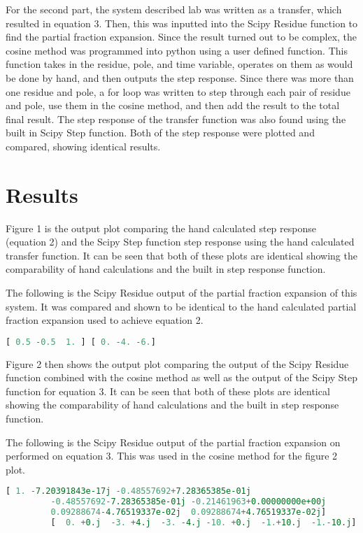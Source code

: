 \documentclass[12pt, titlepage]{article}
\begin{document}
       For the second part, the system described lab was written as a transfer, which resulted in equation 3.  Then, this was inputted into the Scipy Residue function to find the partial fraction expansion.  Since the result turned out to be complex, the cosine method was programmed into python using a user defined function.  This function takes in the residue, pole, and time variable, operates on them as would be done by hand, and then outputs the step response.  Since there was more than one residue and pole, a for loop was written to step through each pair of residue and pole, use them in the cosine method, and then add the result to the total final result.  The step response of the transfer function was also found using the built in Scipy Step function.  Both of the step response were plotted and compared, showing identical results.
        
        \section{Results}
       Figure 1 is the output plot comparing the hand calculated step response (equation 2) and the Scipy Step function step response using the hand calculated transfer function.  It can be seen that both of these plots are identical showing the comparability of hand calculations and the built in step response function.
       
       The following is the Scipy Residue output of the partial fraction expansion of this system.  It was compared and shown to be identical to the hand calculated partial fraction expansion used to achieve equation 2.
       
       \begin{lstlisting}[language=Python]
         [ 0.5 -0.5  1. ] [ 0. -4. -6.]
       \end{lstlisting}
       
       Figure 2 then shows the output plot comparing the output of the Scipy Residue function combined with the cosine method as well as the output of the Scipy Step function for equation 3.  It can be seen that both of these plots are identical showing the comparability of hand calculations and the built in step response function.
       
       The following is the Scipy Residue output of the partial fraction expansion on performed on equation 3.  This was used in the cosine method for the figure 2 plot.
       
       \begin{lstlisting}[language=Python]
         [ 1. -7.20391843e-17j -0.48557692+7.28365385e-01j
         -0.48557692-7.28365385e-01j -0.21461963+0.00000000e+00j
         0.09288674-4.76519337e-02j  0.09288674+4.76519337e-02j] 
         [  0. +0.j  -3. +4.j  -3. -4.j -10. +0.j  -1.+10.j  -1.-10.j]
       \end{lstlisting}
       
\end{document}
